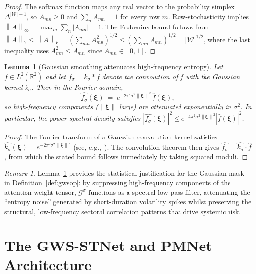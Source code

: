 \documentclass[11pt,a4paper]{article}  %
\newcommand{\R}{\mathbb{R}}
\newcommand{\Gop}{\mathcal{G}^{\sigma}}
\newcommand{\norm}[1]{\left\lVert#1\right\rVert}
\newcommand{\abs}[1]{\left\lvert#1\right\rvert}
\theoremstyle{plain}
\newtheorem{lemma}[theorem]{Lemma}
\theoremstyle{definition}
\theoremstyle{remark}
\newtheorem{remark}{Remark}[section]
\begin{document}
\begin{proof}
The softmax function maps any real vector to the probability simplex
$\Delta^{\abs{\mathcal{W}}-1}$, so $A_{mn}\geq 0$ and
$\sum_n A_{mn} = 1$ for every row $m$. Row-stochasticity implies
$\norm{A}_\infty = \max_m\sum_n\abs{A_{mn}} = 1$. The Frobenius bound
follows from $\norm{A}_2\leq\norm{A}_F = (\sum_{mn}A_{mn}^2)^{1/2}
\leq (\sum_{mn}A_{mn})^{1/2} = \abs{\mathcal{W}}^{1/2}$, where the
last inequality uses $A_{mn}^2\leq A_{mn}$ since $A_{mn}\in[0,1]$.
\end{proof}

\begin{lemma}[Gaussian smoothing attenuates high-frequency entropy]
\label{lem:spectral}
Let $f\in L^2(\R^2)$ and let $f_\sigma = k_\sigma * f$ denote the
convolution of $f$ with the Gaussian kernel $k_\sigma$. Then in the
Fourier domain,
\[
   \widehat{f_\sigma}(\boldsymbol{\xi})
   \;=\; e^{-2\pi^2\sigma^2\norm{\boldsymbol{\xi}}^2}
   \,\widehat{f}(\boldsymbol{\xi}),
\]
so high-frequency components ($\norm{\boldsymbol{\xi}}$ large) are
attenuated exponentially in $\sigma^2$. In particular, the
power spectral density satisfies
$\abs{\widehat{f_\sigma}(\boldsymbol{\xi})}^2 \leq
e^{-4\pi^2\sigma^2\norm{\boldsymbol{\xi}}^2}
\abs{\widehat{f}(\boldsymbol{\xi})}^2$.
\end{lemma}

\begin{proof}
The Fourier transform of a Gaussian convolution kernel satisfies
$\widehat{k_\sigma}(\boldsymbol{\xi}) = e^{-2\pi^2\sigma^2\norm{\boldsymbol{\xi}}^2}$
(see, e.g.,~\cite{Stein2003}). The convolution theorem then gives
$\widehat{f_\sigma} = \widehat{k_\sigma}\cdot\widehat{f}$, from which
the stated bound follows immediately by taking squared moduli.
\end{proof}

\begin{remark}
Lemma~\ref{lem:spectral} provides the statistical justification for
the Gaussian mask in Definition~\ref{def:gwsop}: by suppressing
high-frequency components of the attention weight tensor, $\Gop$
functions as a spectral low-pass filter, attenuating the
``entropy noise'' generated by short-duration volatility spikes
whilst preserving the structural, low-frequency sectoral correlation
patterns that drive systemic risk.
\end{remark}

\section{The GWS-STNet and PMNet Architecture}
\label{sec:architecture}
\end{document}
